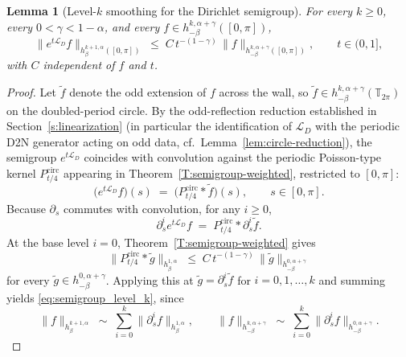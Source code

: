 \documentclass{amsart}
\newtheorem{lemma}[theorem]{Lemma}
\begin{document}
\begin{lemma}[Level-$k$ smoothing for the Dirichlet semigroup]
\label{lem:semigroup_level_k}
For every $k \ge 0$, every $0 < \gamma < 1 - \alpha$, and every $f \in h^{k,\alpha+\gamma}_{-\beta}([0,\pi])$,
\begin{equation}\label{eq:semigroup_level_k}
\bigl\|e^{t\mathcal{L}_D}f\bigr\|_{h^{k+1,\alpha}_\beta([0,\pi])}
 \;\le\; C\, t^{-(1-\gamma)}\, \|f\|_{h^{k,\alpha+\gamma}_{-\beta}([0,\pi])},
\qquad t \in (0, 1],
\end{equation}
with $C$ independent of $f$ and $t$.
\end{lemma}

\begin{proof}
Let $\widetilde f$ denote the odd extension of $f$ across the wall, so $\widetilde f \in h^{k,\alpha+\gamma}_{-\beta}(\mathbb{T}_{2\pi})$ on the doubled-period circle. By the odd-reflection reduction established in Section~\ref{s:linearization} (in particular the identification of $\mathcal{L}_D$ with the periodic D2N generator acting on odd data, cf.\ Lemma~\ref{lem:circle-reduction}), the semigroup $e^{t\mathcal{L}_D}$ coincides with convolution against the periodic Poisson-type kernel $P^{\mathrm{circ}}_{t/4}$ appearing in Theorem~\ref{T:semigroup-weighted}, restricted to $[0,\pi]$:
\[
\bigl(e^{t\mathcal{L}_D}f\bigr)(s) \;=\; \bigl(P^{\mathrm{circ}}_{t/4} * \widetilde f\bigr)(s),
\qquad s \in [0,\pi].
\]
Because $\partial_s$ commutes with convolution, for any $i \ge 0$,
\[
\partial_s^i e^{t\mathcal{L}_D}f
 \;=\; P^{\mathrm{circ}}_{t/4} * \partial_s^i \widetilde f.
\]
At the base level $i = 0$, Theorem~\ref{T:semigroup-weighted} gives
\[
\bigl\|P^{\mathrm{circ}}_{t/4} * \widetilde g\bigr\|_{h^{1,\alpha}_\beta}
\;\le\; C\, t^{-(1-\gamma)}\,
\bigl\|\widetilde g\bigr\|_{h^{0,\alpha+\gamma}_{-\beta}}
\]
for every $\widetilde g \in h^{0,\alpha+\gamma}_{-\beta}$.  Applying this at $\widetilde g = \partial_s^i \widetilde f$ for $i = 0, 1, \ldots, k$ and summing yields \eqref{eq:semigroup_level_k}, since
\[
\|f\|_{h^{k+1,\alpha}_\beta} \;\sim\; \sum_{i=0}^{k}\|\partial_s^i f\|_{h^{1,\alpha}_\beta},
\qquad
\|f\|_{h^{k,\alpha+\gamma}_{-\beta}} \;\sim\; \sum_{i=0}^{k}\|\partial_s^i f\|_{h^{0,\alpha+\gamma}_{-\beta}}.
\]
\end{proof}
\end{document}
